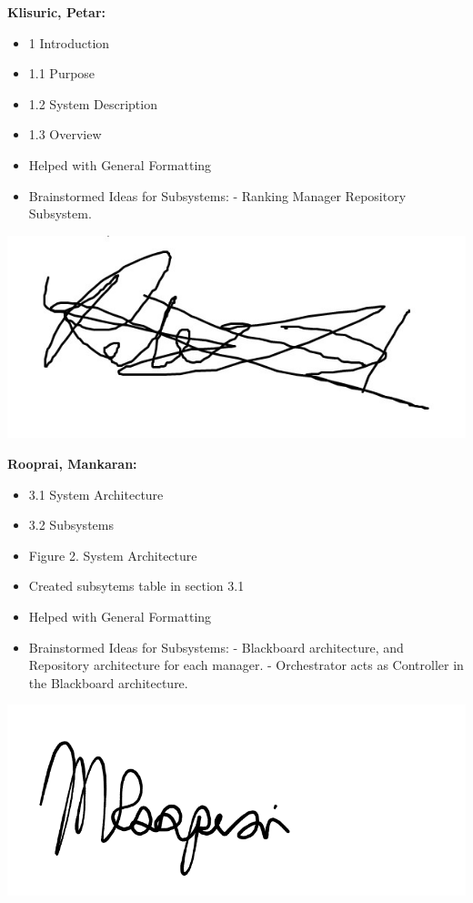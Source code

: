 \documentclass[]{article}
\begin{document}
\textbf{Klisuric, Petar:}
\begin{itemize}
	\item 1 Introduction
	\item 1.1 Purpose
	\item 1.2 System Description
	\item 1.3 Overview
        \item Helped with General Formatting
    \item Brainstormed Ideas for Subsystems:
		\subitem - Ranking Manager Repository Subsystem.
\end{itemize}
\includegraphics[scale=0.15]{petarsignature.jpg}

\textbf{Rooprai, Mankaran:}
\begin{itemize}
	\item 3.1 System Architecture
	\item 3.2 Subsystems
	\item Figure 2. System Architecture
	\item Created subsytems table in section 3.1
 	\item Helped with General Formatting
  	\item Brainstormed Ideas for Subsystems:
		\subitem - Blackboard architecture, and Repository architecture for each manager.
  		\subitem - Orchestrator acts as Controller in the Blackboard architecture.
\end{itemize}
\includegraphics[scale=0.15]{mankaransignature.png}
\end{document}
